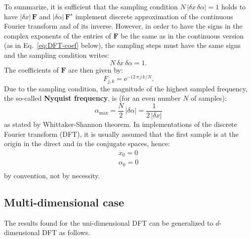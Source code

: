 \documentclass[a4paper]{article}
\newcommand*{\mathe}{\mathrm{e}}
\newcommand*{\mathi}{\mathrm{i}}
\begin{document}
To summarize, it is sufficient that the sampling condition $N\,|δx\,δα| = 1$
holds to have $|δx|\,\mathbf{F}$ and $|δα|\,\mathbf{F}^{\star}$ implement
discrete approximation of the continuous Fourier transform and of its inverse.
However, in order to have the signs in the complex exponents of the entries of
$\mathbf{F}$ be the same as in the continuous version (as in
Eq.~\eqref{eq:DFT-coef} below), the sampling steps must have the same signs and
the sampling condition writes:
\begin{equation}
  \label{eq:DFT-sampling-condition,1D}
  N\,δx\,δα = 1.
\end{equation}
The coefficients of $\mathbf{F}$ are then given by:
\begin{equation}
  \label{eq:DFT-coef}
  F_{j,k} = \mathe^{-\mathi\,2\,π\,j\,k/N}.
\end{equation}
Due to the sampling condition, the magnitude of the highest sampled frequency,
the so-called \textbf{Nyquist frequency}, is (for an even number $N$ of
samples):
\begin{equation}
  \label{eq:Nyquist}
  α_\text{max} = \frac{N}{2}\,|δα| = \frac{1}{2\,|δx|}
\end{equation}
as stated by Whittaker-Shannon theorem. In implementations of the discrete
Fourier transform (DFT), it is usually assumed that the first sample is at the
origin in the direct and in the conjugate spaces, hence:
\begin{equation}
  \label{eq:DFT-origins}
  \begin{array}{l}
    x_{0} = 0\\
    α_{0} = 0\\
  \end{array}
\end{equation}
by convention, not by necessity.


\subsection{Multi-dimensional case}

The results found for the uni-dimensional DFT can be generalized to
$d$-dimensional DFT as follows.
\end{document}
